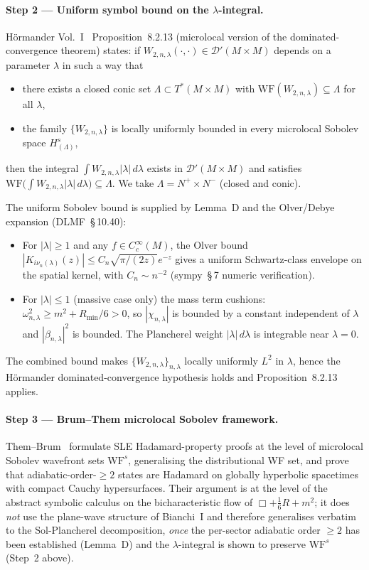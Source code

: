 \documentclass[11pt,a4paper]{article}
\theoremstyle{definition}
\newcommand{\WF}{\mathrm{WF}}
\begin{document}
\paragraph{Step 2 --- Uniform symbol bound on the $\lambda$-integral.}
H\"ormander Vol.~I~\cite{Hor83} Proposition~8.2.13 (microlocal version of
the dominated-convergence theorem) states: if
$W_{2,n,\lambda}(\cdot,\cdot)\in\mathcal{D}'(M\times M)$ depends on a
parameter $\lambda$ in such a way that
\begin{itemize}
  \item there exists a closed conic set $\Lambda\subset T^*(M\times M)$
        with $\WF(W_{2,n,\lambda})\subseteq \Lambda$ for all $\lambda$,
  \item the family $\{W_{2,n,\lambda}\}$ is locally uniformly bounded in
        every microlocal Sobolev space $H^s_{(\Lambda)}$,
\end{itemize}
then the integral $\int W_{2,n,\lambda}|\lambda|\,d\lambda$ exists in
$\mathcal{D}'(M\times M)$ and satisfies
$\WF\bigl(\int W_{2,n,\lambda}|\lambda|\,d\lambda\bigr)\subseteq \Lambda$.
We take $\Lambda = N^+\times N^-$ (closed and conic).

The uniform Sobolev bound is supplied by Lemma~D and the
Olver/Debye expansion (DLMF~\S\,10.40):
\begin{itemize}
  \item For $|\lambda|\geq 1$ and any $f\in C_c^\infty(M)$, the Olver bound
        $|K_{i\nu_n(\lambda)}(z)|\leq C_n\sqrt{\pi/(2z)}e^{-z}$
        gives a uniform Schwartz-class envelope on the spatial kernel,
        with $C_n\sim n^{-2}$ (sympy~\S\,7 numeric verification).
  \item For $|\lambda|\leq 1$ (massive case only) the mass term cushions:
        $\omega^2_{n,\lambda}\geq m^2+R_{\min}/6 > 0$, so
        $|\chi_{n,\lambda}|$ is bounded by a constant independent of $\lambda$
        and $|\beta_{n,\lambda}|^2$ is bounded.  The Plancherel weight
        $|\lambda|\,d\lambda$ is integrable near $\lambda=0$.
\end{itemize}
The combined bound makes $\{W_{2,n,\lambda}\}_{n,\lambda}$ locally uniformly
$L^2$ in $\lambda$, hence the H\"ormander dominated-convergence hypothesis
holds and Proposition~8.2.13 applies.

\paragraph{Step 3 --- Brum--Them microlocal Sobolev framework.}
Them--Brum~\cite{TB13} formulate SLE Hadamard-property proofs at the
level of microlocal Sobolev wavefront sets $\WF^s$, generalising the
distributional WF set, and prove that adiabatic-order-$\geq 2$ states are
Hadamard on globally hyperbolic spacetimes with compact Cauchy
hypersurfaces.  Their argument is at the level of the abstract symbolic
calculus on the bicharacteristic flow of $\Box+\tfrac{1}{6}R+m^2$;
it does \emph{not} use the plane-wave structure of Bianchi~I and
therefore generalises verbatim to the Sol-Plancherel decomposition,
\emph{once} the per-sector adiabatic order $\geq 2$ has been established
(Lemma~D) and the $\lambda$-integral is shown to preserve $\WF^s$
(Step~2 above).
\end{document}
